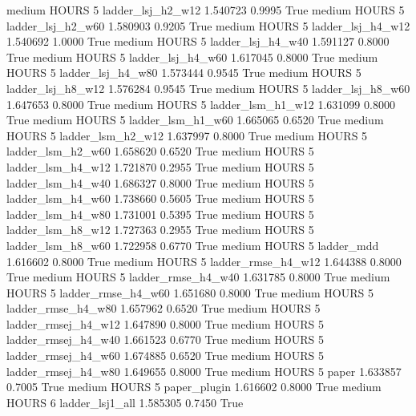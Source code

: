     medium    HOURS                 5   ladder_lsj_h2_w12   1.540723      0.9995    True
    medium    HOURS                 5   ladder_lsj_h2_w60   1.580903      0.9205    True
    medium    HOURS                 5   ladder_lsj_h4_w12   1.540692      1.0000    True
    medium    HOURS                 5   ladder_lsj_h4_w40   1.591127      0.8000    True
    medium    HOURS                 5   ladder_lsj_h4_w60   1.617045      0.8000    True
    medium    HOURS                 5   ladder_lsj_h4_w80   1.573444      0.9545    True
    medium    HOURS                 5   ladder_lsj_h8_w12   1.576284      0.9545    True
    medium    HOURS                 5   ladder_lsj_h8_w60   1.647653      0.8000    True
    medium    HOURS                 5   ladder_lsm_h1_w12   1.631099      0.8000    True
    medium    HOURS                 5   ladder_lsm_h1_w60   1.665065      0.6520    True
    medium    HOURS                 5   ladder_lsm_h2_w12   1.637997      0.8000    True
    medium    HOURS                 5   ladder_lsm_h2_w60   1.658620      0.6520    True
    medium    HOURS                 5   ladder_lsm_h4_w12   1.721870      0.2955    True
    medium    HOURS                 5   ladder_lsm_h4_w40   1.686327      0.8000    True
    medium    HOURS                 5   ladder_lsm_h4_w60   1.738660      0.5605    True
    medium    HOURS                 5   ladder_lsm_h4_w80   1.731001      0.5395    True
    medium    HOURS                 5   ladder_lsm_h8_w12   1.727363      0.2955    True
    medium    HOURS                 5   ladder_lsm_h8_w60   1.722958      0.6770    True
    medium    HOURS                 5          ladder_mdd   1.616602      0.8000    True
    medium    HOURS                 5  ladder_rmse_h4_w12   1.644388      0.8000    True
    medium    HOURS                 5  ladder_rmse_h4_w40   1.631785      0.8000    True
    medium    HOURS                 5  ladder_rmse_h4_w60   1.651680      0.8000    True
    medium    HOURS                 5  ladder_rmse_h4_w80   1.657962      0.6520    True
    medium    HOURS                 5 ladder_rmsej_h4_w12   1.647890      0.8000    True
    medium    HOURS                 5 ladder_rmsej_h4_w40   1.661523      0.6770    True
    medium    HOURS                 5 ladder_rmsej_h4_w60   1.674885      0.6520    True
    medium    HOURS                 5 ladder_rmsej_h4_w80   1.649655      0.8000    True
    medium    HOURS                 5               paper   1.633857      0.7005    True
    medium    HOURS                 5        paper_plugin   1.616602      0.8000    True
    medium    HOURS                 6     ladder_lsj1_all   1.585305      0.7450    True
